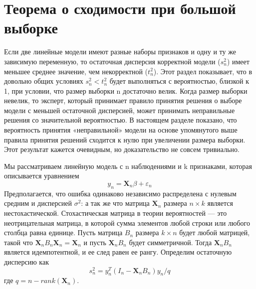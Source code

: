 \documentclass[12pt, twoside]{article}
\newcommand{\X}{\mathbf{X}}
\theoremstyle{definition}
\begin{document}
\section{Теорема о сходимости при большой выборке}

Если две линейные модели имеют разные наборы признаков и одну и ту же зависимую переменную, то остаточная дисперсия корректной модели ($s_n^2$) имеет меньшее среднее значение, чем некорректной ($t_n^2$). Этот раздел показывает, что в довольно общих условиях $s_n^2 <t_n^2$ будет выполняться с вероятностью, близкой к 1, при условии, что размер выборки n достаточно велик. Когда размер выборки невелик,  то эксперт, который принимает правило принятия решения о выборе модели с меньшей остаточной дисперсией, может принимать неправильные решения со значительной вероятностью. В настоящем разделе показано, что вероятность принятия «неправильной» модели на основе упомянутого выше правила принятия решений сходится к нулю при увеличении размера выборки. Этот результат кажется очевидным, но доказательство не совсем тривиально.

Мы рассматриваем линейную модель с n наблюдениями и k признаками, которая описывается уравнением 
\begin{equation}\label{eq3}
y_n = \X_n\beta+\varepsilon_n
\end{equation}
Предполагается, что ошибка одинаково независимо распределена с нулевым средним и дисперсией $\sigma^2$: а так же что матрица $\X_n$ размера $n\times k$ является нестохастической. Стохастическая матрица в теории вероятностей — это неотрицательная матрица, в которой сумма элементов любой строки или любого столбца равна единице. Пусть матрица $B_n$ размера $k\times n$ будет любой матрицей, такой что $\X_n B_n \X_n = \X_n$ и пусть $\X_n B_n$ будет симметричной. Тогда $\X_n B_n$ является идемпотентной, и ее след равен ее рангу. Определим остаточную дисперсию как 
\begin{equation}\label{eq4}
s_n^2 = y_n^{T}(I_n - \X_n B_n)y_n/q
\end{equation}
где $q = n - rank(\X_n)$.
\end{document}
